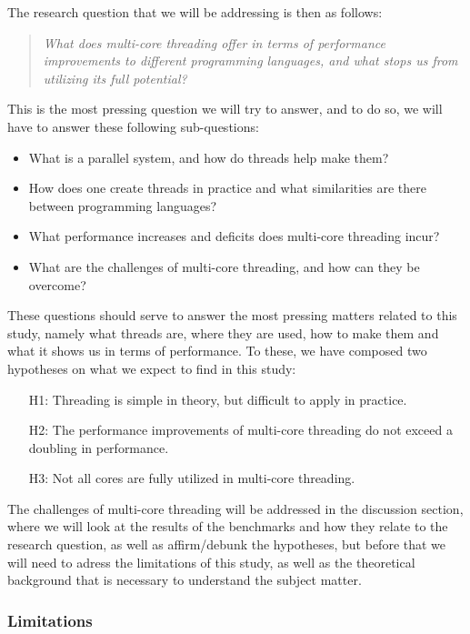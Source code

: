 \documentclass[12pt,a4paper]{article}
\begin{document}
The research question that we will be addressing is then as follows:

\begin{quote}
    \textit{What does multi-core threading offer in terms of performance improvements to different programming languages, and what stops us from utilizing its full potential?}
\end{quote}

This is the most pressing question we will try to answer, and to do so, we will have to answer these following sub-questions:

\begin{itemize}
    \item What is a parallel system, and how do threads help make them?
    \item How does one create threads in practice and what similarities are there between programming languages?
    \item What performance increases and deficits does multi-core threading incur?
    \item What are the challenges of multi-core threading, and how can they be overcome?
\end{itemize}

These questions should serve to answer the most pressing matters related to this study, namely what threads are, where they are used, how to make them and what it shows us in terms of performance. To these, we have composed two hypotheses on what we expect to find in this study:

\begin{itemize}
    \item[H1:] Threading is simple in theory, but difficult to apply in practice.
    \item[H2:] The performance improvements of multi-core threading do not exceed a doubling in performance.
    \item[H3:] Not all cores are fully utilized in multi-core threading.
\end{itemize}

The challenges of multi-core threading will be addressed in the discussion section, where we will look at the results of the benchmarks and how they relate to the research question, as well as affirm/debunk the hypotheses, but before that we will need to adress the limitations of this study, as well as the theoretical background that is necessary to understand the subject matter.

\subsubsection{Limitations}
\end{document}
